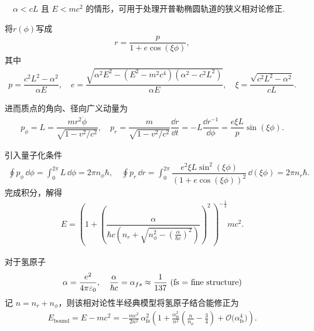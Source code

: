 \begin{exbox}
	\(\quad\alpha < cL\) 且 \(E < mc^2\) 的情形，可用于处理开普勒椭圆轨道的狭义相对论修正.

	将\(r(\phi)\)写成
	\begin{align*}
		r = \dfrac{p}{1 + e \cos (\xi \phi)},
	\end{align*}
	其中
	\begin{align*}
		p = \dfrac{c^2 L^2 - \alpha^2}{\alpha E}, \quad
		e = \dfrac{\sqrt{\alpha^2 E^2 - (E^2 - m^2 c^4) (\alpha^2 - c^2 L^2)}}{\alpha E}, \quad
		\xi = \dfrac{\sqrt{c^2 L^2 - \alpha^2}}{cL}.
	\end{align*}

	进而质点的角向、径向广义动量为
	\begin{align*}
		p_{\phi} = L = \dfrac{m r^2 \dot{\phi}}{\sqrt{1 - v^2/c^2}}, \quad
		p_r = \dfrac{m}{\sqrt{1 - v^2/c^2}} \dfrac{\dd r}{\dd t} = -L \dfrac{\dd r^{-1}}{\dd \phi} = \dfrac{e\xi L}{p} \sin (\xi \phi).
	\end{align*}

	引入量子化条件
	\begin{align*}
		\oint p_{\phi} \, \dd \phi =\int_{0}^{2\pi} L \, \dd \phi = 2 \pi n_{\phi} \hbar, \quad
		\oint p_r \, \dd r =\int_{0}^{2\pi} \dfrac{e^2 \xi L \sin^2 (\xi \phi)}{(1 + e \cos (\xi \phi))^2} \, \dd(\xi \phi) = 2 \pi n_r \hbar.
	\end{align*}
	完成积分，解得
	\begin{align*}
		E = \left(1 + \left(\dfrac{\alpha}{\hbar c \left(n_r + \sqrt{n_{\phi}^2 - \left(\frac{\alpha}{\hbar c}\right)^2}\right)}\right)^2\,\right)^{-\frac{1}{2}} m c^2.
	\end{align*}

	对于氢原子
	\begin{align*}
		\alpha=\frac{e^2}{4\pi\varepsilon_0},\quad \frac{\alpha}{\hbar c}=\alpha_{fs}\approx\frac{1}{137}\,\text{\,(fs = fine structure)}
	\end{align*}
	记 \(n=n_r+n_{\phi}\)，则该相对论性半经典模型将氢原子结合能修正为
	\begin{align*}
		E_{\text{bound}} =
		E - mc^2 =
		-\frac{m c^2}{2 n^2}\,
		\alpha_{\mathrm{fs}}^2 \left(
		1 +
		\frac{
			\alpha_{\mathrm{fs}}^2
		}{n^2}\left(
		\frac{n}{n_{\phi}} - \frac{3}{4}
		\right)
		+ \mathcal{O}\bigl(\alpha_{\mathrm{fs}}^4\bigr)
		\right).
	\end{align*}
\end{exbox}

